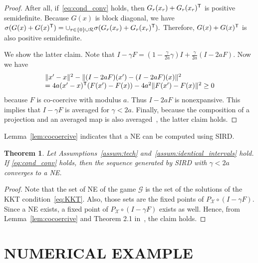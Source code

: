 \documentclass[letterpaper, 10 pt, conference]{ieeeconf}  %
\newcommand{\mc}[1]{\mathcal{#1}}
\newtheorem{theorem}{Theorem}
\begin{document}
\begin{proof}
After all, if~\eqref{eq:cond_conv} holds, then $G_r(x_r)+G_r(x_r)^{\sf T}$ is positive semidefinite.
Because $G(x)$ is block diagonal, we have $\sigma(G(x)+G(x)^{\sf T})=\cup_{r\in\{0\}\cup\mc{R}} \sigma(G_r(x_r)+G_r(x_r)^{\sf T}).$
Therefore, $G(x)+G(x)^{\sf T}$ is also positive semidefinite.

We show the latter claim.
Note that $I-\gamma F=(1-\frac{\gamma}{2a}\gamma)I+\frac{\gamma}{2a}(I-2aF).$
Now we have
\[
\begin{array}{l}
 \|x'-x\|^2-\|(I-2aF)(x')-(I-2aF)(x) \|^2\\
 = 4a(x'-x)^{\sf T}(F(x') - F(x)) - 4a^2\|F(x')-F(x)\|^2 \geq 0 
\end{array}
\]
because $F$ is co-coercive with modulus $a$.
Thus $I-2aF$ is nonexpansive.
This implies that $I-\gamma F$ is averaged for $\gamma<2a$.
Finally, because the composition of a projection and an averaged map is also averaged~\cite[Proposition 2.1]{Byrne2003Unified}, the latter claim holds.
\end{proof}


Lemma~\ref{lem:cocoercive} indicates that a NE can be computed using SIRD.
\begin{theorem}
Let Assumptions~\ref{assum:tech} and~\ref{assum:identical_intervals} hold.
If \eqref{eq:cond_conv} holds, then the sequence generated by SIRD with $\gamma<2a$ converges to a NE.
\end{theorem}
\begin{proof}
Note that the set of NE of the game $\mc{G}$ is the set of the solutions of the KKT condition~\eqref{eq:KKT}.
Also, those sets are the fixed points of $P_{\mc{X}}\circ (I-\gamma F)$.
Since a NE exists, a fixed point of $P_{\mc{X}}\circ (I-\gamma F)$ exists as well.
Hence, from Lemma~\ref{lem:cocoercive} and Theorem 2.1 in~\cite{Byrne2003Unified}, the claim holds.
\end{proof}

\section{NUMERICAL EXAMPLE}
\label{sec:num}
\end{document}
